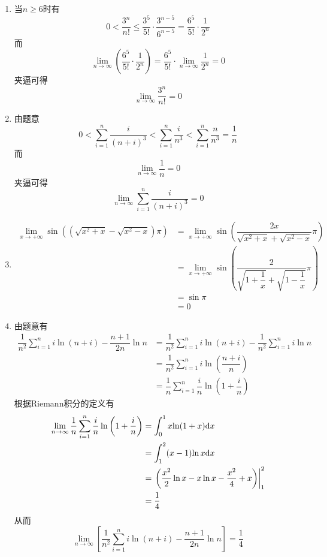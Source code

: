 \documentclass{ctexart}
\begin{document}
\begin{solution}[Solution.]
    \begin{enumerate}[leftmargin=*,label=\textbf{(\arabic*)}]
        \item 当$n\geqslant6$时有
            $$0<\dfrac{3^n}{n!}\leqslant\dfrac{3^5}{5!}\cdot\dfrac{3^{n-5}}{6^{n-5}}=\dfrac{6^5}{5!}\cdot\dfrac{1}{2^n}$$
            而$$\lim_{n\to\infty}\left(\dfrac{6^5}{5!}\cdot\dfrac{1}{2^n}\right)=\dfrac{6^5}{5!}\cdot\lim_{n\to\infty}\dfrac{1}{2^n}=0$$
            夹逼可得$$\lim_{n\to\infty}{\dfrac{3^n}{n!}}=0$$
        \item 由题意$$0<\sum_{i=1}^{n}{\dfrac{i}{(n+i)^3}}<\sum_{i=1}^{n}{\dfrac{i}{n^3}}<\sum_{i=1}^{n}{\dfrac{n}{n^3}}=\dfrac{1}{n}$$
            而$$\lim_{n\to\infty}{\dfrac{1}{n}}=0$$
            夹逼可得$$\lim_{n\to\infty}{\sum_{i=1}^{n}{\dfrac{i}{(n+i)^3}}}=0$$
        \item 
            $$\begin{aligned}
                \lim_{x\to+\infty}{\sin\left(\left(\sqrt{x^2+x}-\sqrt{x^2-x}\right)\pi\right)}
                &= \lim_{x\to+\infty}{\sin\left(\dfrac{2x}{\sqrt{x^2+x}+\sqrt{x^2-x}}\pi\right)} \\
                &= \lim_{x\to+\infty}{\sin\left(\dfrac{2}{\sqrt{1+\dfrac{1}{x}}+\sqrt{1-\dfrac{1}{x}}}\pi\right)} \\
                &= \sin\pi \\
                &= 0
            \end{aligned}$$
        \item 由题意有
            $$\begin{aligned}
                \dfrac{1}{n^2}\sum_{i=1}^{n}i\ln(n+i)-\dfrac{n+1}{2n}\ln{n}
                &= \dfrac{1}{n^2}\sum_{i=1}^{n}i\ln(n+i)-\dfrac{1}{n^2}\sum_{i=1}^{n}i\ln{n} \\
                &= \dfrac{1}{n^2}\sum_{i=1}^{n}{i\ln{\left(\dfrac{n+i}{n}\right)}} \\
                &= \dfrac{1}{n}\sum_{i=1}^{n}{\dfrac{i}{n}\ln\left(1+\dfrac{i}{n}\right)}
            \end{aligned}$$
            根据Riemann积分的定义有
            $$\begin{aligned}
                \lim_{n\to\infty}{\dfrac{1}{n}\sum_{i=1}^{n}{\dfrac{i}{n}\ln\left(1+\dfrac{i}{n}\right)}}
                &= \int_0^1x{\ln(1+x)\mathrm{d} x} \\
                &= \int_1^2(x-1){\ln x\mathrm{d} x} \\
                &= \left.\left(\dfrac{x^2}{2}\ln x-x\ln x-\dfrac{x^2}{4}+x\right)\right|_1^2 \\
                &= \dfrac{1}{4}
            \end{aligned}$$
            从而$$\lim_{n\to\infty}\left[\dfrac{1}{n^2}\sum_{i=1}^{n}i\ln(n+i)-\dfrac{n+1}{2n}\ln{n}\right]=\dfrac{1}{4}$$
    \end{enumerate}
\end{solution}
\end{document}
